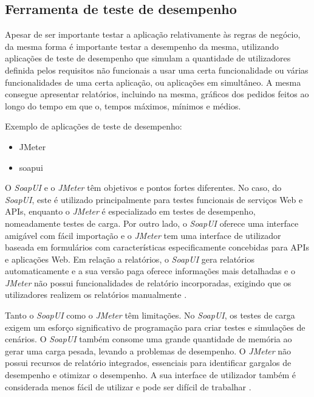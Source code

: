 \subsection{Ferramenta de teste de desempenho}

Apesar de ser importante testar a aplicação relativamente às regras de negócio, da mesma forma é importante testar a desempenho da mesma, utilizando aplicações de teste de desempenho que simulam a quantidade de utilizadores definida pelos requisitos não funcionais a usar uma certa funcionalidade ou várias funcionalidades de uma certa aplicação, ou aplicações em simultâneo. A mesma consegue apresentar relatórios, incluindo na mesma, gráficos dos pedidos feitos ao longo do tempo em que o, tempos máximos, mínimos e médios.

Exemplo de aplicações de teste de desempenho:
\begin{itemize}
    \item JMeter \cite{jmeter}
    \item \ac{soapui} \cite{soapui}
\end{itemize}

O \textit{SoapUI} e o \textit{JMeter} têm objetivos e pontos fortes diferentes. No caso, do \textit{SoapUI}, este é utilizado principalmente para testes funcionais de serviços Web e APIs, enquanto o \textit{JMeter} é especializado em testes de desempenho, nomeadamente testes de carga. Por outro lado, o \textit{SoapUI} oferece uma interface amigável com fácil importação e o \textit{JMeter} tem uma interface de utilizador baseada em formulários com características especificamente concebidas para APIs e aplicações Web. Em relação a relatórios, o \textit{SoapUI} gera relatórios automaticamente e a sua versão paga oferece informações mais detalhadas e o \textit{JMeter} não possui funcionalidades de relatório incorporadas, exigindo que os utilizadores realizem os relatórios manualmente \cite{soapuivsJmeter}.

Tanto o \textit{SoapUI} como o \textit{JMeter} têm limitações. No \textit{SoapUI}, os testes de carga exigem um esforço significativo de programação para criar testes e simulações de cenários. O \textit{SoapUI} também consome uma grande quantidade de memória ao gerar uma carga pesada, levando a problemas de desempenho. O \textit{JMeter} não possui recursos de relatório integrados, essenciais para identificar gargalos de desempenho e otimizar o desempenho. A sua interface de utilizador também é considerada menos fácil de utilizar e pode ser difícil de trabalhar \cite{soapuivsJmeter}.

